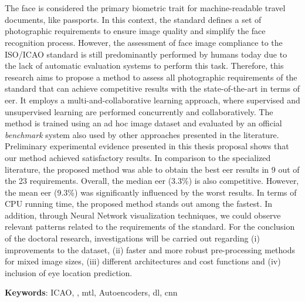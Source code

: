 \section*{}

The face is considered the primary biometric trait for machine-readable travel documents, like passports. In this context, the \icao standard defines a set of photographic requirements to ensure image quality and simplify the face recognition process. However, the assessment of face image compliance to the ISO/ICAO standard is still predominantly performed by humans today due to the lack of automatic evaluation systems to perform this task. Therefore, this research aims to propose a method to assess all photographic requirements of the \icao standard that can achieve competitive results with the state-of-the-art in terms of \acf{eer}. It employs a multi-and-collaborative learning approach, where supervised and unsupervised learning are performed concurrently and collaboratively. The method is trained using an ad hoc image dataset and evaluated by an official \textit{benchmark} system also used by other approaches presented in the literature. Preliminary experimental evidence presented in this thesis proposal shows that our method achieved satisfactory results. In comparison to the specialized literature, the proposed method was able to obtain the best \acs{eer} results in 9 out of the 23 requirements. Overall, the median \acs{eer} (3.3\%) is also competitive. However, the mean \acs{eer} (9.3\%) was significantly influenced by the worst results. In terms of CPU running time, the proposed method stands out among the fastest. In addition, through Neural Network visualization techniques, we could observe relevant patterns related to the requirements of the \icao standard. For the conclusion of the doctoral research, investigations will be carried out regarding (i) improvements to the dataset, (ii) faster and more robust pre-processing methods for mixed image sizes, (iii) different architectures and cost functions and (iv) inclusion of eye location prediction.

\vspace{2em}

\noindent
\textbf{Keywords}: ICAO, \icao, \acl{mtl}, Autoencoders, \acl{dl}, \acl{cnn}

\newpage
